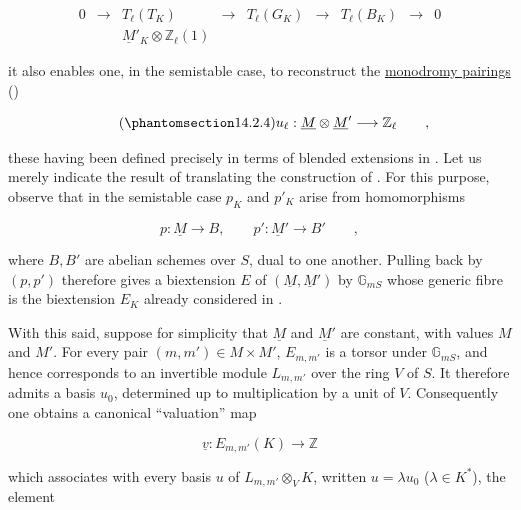 \begin{equation*}
\begin{array}{ccccccccc}
0&\longrightarrow&T_\ell(T_K)&\longrightarrow&T_\ell(G_K)
 &\longrightarrow&T_\ell(B_K)&\longrightarrow&0\\[5ex]
 &&\underline M'_K\otimes\mathbb Z_\ell(1)&&&&&&
\end{array}
\end{equation*}

\noindent
it also enables one, in the semistable case, to reconstruct the
\underline{monodromy pairings} ()

\begin{equation}\tag{\SGARefTarget{sga7.sga7i.eix.n14-2-4}{14.2.4}}
 u_\ell:\underline M\otimes\underline M'
 \longrightarrow\mathbb Z_\ell\qquad ,
\end{equation}

\noindent
these having been defined precisely in terms of blended extensions in
.  Let us merely indicate the result of translating the construction
of .  For this purpose, observe that in the semistable case $p_K$
and $p'_K$ arise from homomorphisms

\begin{equation*}
 p:\underline M\longrightarrow B,\qquad
 p':\underline M'\longrightarrow B'\qquad ,
\end{equation*}

\noindent
where $B,B'$ are abelian schemes over $S$, dual to one another.  Pulling
back by $(p,p')$ therefore gives a biextension $E$ of
$(\underline M,\underline M')$ by $\mathbb G_{mS}$ whose generic fibre
is the biextension $E_K$ already considered in .

With this said, suppose for simplicity that $\underline M$ and
$\underline M'$ are constant, with values $M$ and $M'$.  For every
pair $(m,m')\in M\times M'$, $E_{m,m'}$ is a torsor under
$\mathbb G_{mS}$, and hence corresponds to an invertible module
$L_{m,m'}$ over the ring $V$ of $S$.  It therefore admits a basis
$u_0$, determined up to multiplication by a unit of $V$.  Consequently
one obtains a canonical ``valuation'' map

\begin{equation*}
 \underline v:E_{m,m'}(K)\longrightarrow\mathbb Z
\end{equation*}

\noindent
which associates with every basis $u$ of
$L_{m,m'}\otimes_V K$, written $u=\lambda u_0$ ($\lambda\in K^*$),
the element

